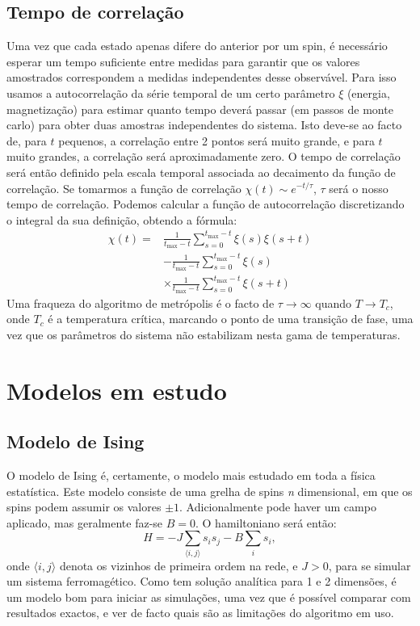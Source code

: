 \documentclass[a4paper,10pt]{article}
\begin{document}
\begin{multicols}{2}
\subsection{Tempo de correlação}
Uma vez que cada estado apenas difere do anterior por um spin, é necessário esperar um tempo suficiente entre medidas para garantir que os valores amostrados correspondem a medidas independentes desse observável. Para isso usamos a autocorrelação da série temporal de um certo parâmetro $\xi$ (energia, magnetização) para estimar quanto tempo deverá passar (em passos de monte carlo) para obter duas amostras independentes do sistema. Isto deve-se ao facto de, para $t$ pequenos, a correlação entre 2 pontos será muito grande, e para $t$ muito grandes, a correlação será aproximadamente zero. O tempo de correlação será então definido pela escala temporal associada ao decaimento da função de correlação. Se tomarmos a função de correlação $\chi(t)\sim e^{-t/\tau}$, $\tau$ será o nosso tempo de correlação. Podemos calcular a função de autocorrelação discretizando o integral da sua definição, obtendo a fórmula\cite{barkema}:
\begin{equation}
\begin{split}
	\chi(t)=&
	\frac{1}{t_{\mathrm{max}}-t}\sum^{t_\mathrm{max}-t}_{s=0}\xi(s)\xi(s+t)\\
	&-\frac{1}{t_{\mathrm{max}}-t}\sum^{t_\mathrm{max}-t}_{s=0}\xi(s)\\
	&\times\frac{1}{t_{\mathrm{max}}-t}\sum^{t_\mathrm{max}-t}_{s=0}\xi(s+t)
\end{split}
\end{equation}
Uma fraqueza do algoritmo de metrópolis é o facto de $\tau\rightarrow\infty$ quando $T\rightarrow T_c$, onde $T_c$ é a temperatura crítica, marcando o ponto de uma transição de fase, uma vez que os parâmetros do sistema não estabilizam nesta gama de temperaturas\cite{barkema}.

\section{Modelos em estudo}
\subsection{Modelo de Ising}
O modelo de Ising é, certamente, o modelo mais estudado em toda a física estatística. Este modelo consiste de uma grelha de spins \textit{n} dimensional, em que os spins podem assumir os valores $\pm 1$. Adicionalmente pode haver um campo aplicado, mas geralmente faz-se $B=0$. O hamiltoniano será então\cite{barkema}:
\begin{equation}
H = - J \sum_{\langle i,j \rangle} s_i s_j - B \sum_i s_i ,
\end{equation}
onde $\langle i,j \rangle$ denota os vizinhos de primeira ordem na rede, e $J > 0$, para se simular um sistema ferromagético.
Como tem solução analítica para 1 e 2 dimensões, é um modelo bom para iniciar as simulações, uma vez que é possível comparar com resultados exactos, e ver de facto quais são as limitações do algoritmo em uso.


\end{multicols}
\end{document}
